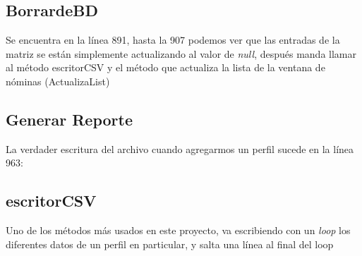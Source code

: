 \documentclass[12pt]{article}
\begin{document}
\subsection{BorrardeBD}
{Se encuentra en la l\'inea 891, hasta la 907 podemos ver que las entradas de la matriz se est\'an simplemente actualizando al valor de \textit{null}, despu\'es manda llamar al m\'etodo escritorCSV y el m\'etodo que actualiza la lista de la ventana de n\'ominas (ActualizaList)}

\subsection{Generar Reporte}
{La verdader escritura del archivo cuando agregarmos un perfil sucede en la l\'inea 963:}


\subsection{escritorCSV}
{Uno de los m\'etodos m\'as usados en este proyecto, va escribiendo con un \textit{loop} los diferentes datos de un perfil en particular, y salta una l\'inea al final del loop}


\end{document}
